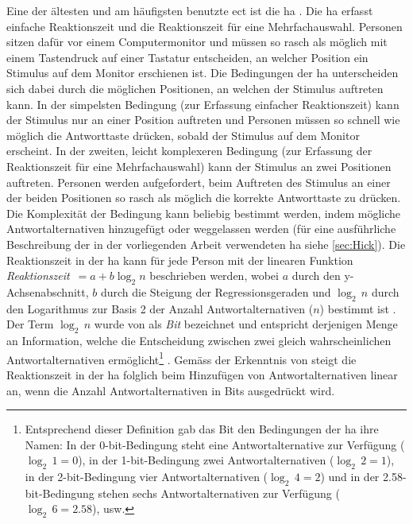 \documentclass[11pt, twoside, a4paper]{book}		%
\begin{document}
Eine der ältesten und am häufigsten benutzte \gls{ect} ist die \gls{ha} \citep{Hick1952}. Die \gls{ha} erfasst einfache Reaktionszeit und die Reaktionszeit für eine Mehrfachauswahl.
Personen sitzen dafür vor einem Computermonitor und müssen so rasch als möglich mit einem Tastendruck auf einer Tastatur entscheiden, an welcher Position ein Stimulus auf dem Monitor erschienen ist. Die Bedingungen der \gls{ha} unterscheiden sich dabei durch die möglichen Positionen, an welchen der Stimulus auftreten kann. 
In der simpelsten Bedingung (zur Erfassung einfacher Reaktionszeit) kann der Stimulus nur an einer Position auftreten und Personen müssen so schnell wie möglich die Antworttaste drücken, sobald der Stimulus auf dem Monitor erscheint.
In der zweiten, leicht komplexeren Bedingung (zur Erfassung der Reaktionszeit für eine Mehrfachauswahl) kann der Stimulus an zwei Positionen auftreten. Personen werden aufgefordert, beim Auftreten des Stimulus an einer der beiden Positionen so rasch als möglich die korrekte Antworttaste zu drücken.
Die Komplexität der Bedingung kann beliebig bestimmt werden, indem mögliche Antwortalternativen hinzugefügt oder weggelassen werden 
(für eine ausführliche Beschreibung der in der vorliegenden Arbeit verwendeten \gls{ha} siehe \autoref{sec:Hick}). 
Die Reaktionszeit in der \gls{ha} kann für jede Person mit der linearen Funktion \textit{Reaktionszeit}~$=a+b\log_{2}n$ beschrieben werden, wobei $a$ durch den y-Achsen\-ab\-schnitt, $b$ durch die Steigung der Regres\-sions\-geraden und $\log_{2}\,n$ durch den Logarithmus zur Basis 2 der Anzahl Antwortalternativen ($n$) bestimmt ist \citep[S. 105]{Jensen1987a}. Der Term $\log_{2}\,n$ wurde von \citet{Hick1952} als \textit{Bit} bezeichnet und entspricht derjenigen Menge an Information, welche die Entscheidung zwischen zwei gleich wahrscheinlichen Antwortalternativen ermöglicht\footnote{Entsprechend dieser Definition gab das Bit den Bedingungen der \gls{ha} ihre Namen: In der 0-bit-Bedingung steht eine Antwortalternative zur Verfügung ($\log_{2}\,1=0$), in der 1-bit-Bedingung zwei Antwortalternativen ($\log_{2}\,2=1$), in der 2-bit-Bedingung vier Antwortalternativen ($\log_{2}\,4=2$) und in der 2.58-bit-Bedingung stehen sechs Antwortalternativen zur Verfügung ($\log_{2}\,6=2.58$), usw.} \citep[siehe auch][S. 27]{Jensen2006}.
Gemäss der Erkenntnis von \citet{Hick1952} steigt die Reaktionszeit in der \gls{ha} folglich beim Hinzufügen von Antwortalternativen linear an, wenn die Anzahl Antwortalternativen in Bits ausgedrückt wird.
\end{document}
